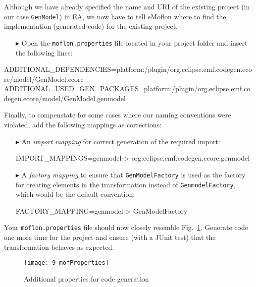 Although we have already specified the name and URI of the existing project (in our case \texttt{GenModel}) in EA, we now have to tell eMoflon where to find the
implementation (generated code) for the existing project.

\begin{enumerate}
\item[$\blacktriangleright$] Open the \texttt{moflon.properties} file located in your project folder and insert the following lines:\\
\end{enumerate}

\vspace{-1cm}
{\small \ttfamily \hspace{-2.5cm} ADDITIONAL\_DEPENDENCIES=platform:/plugin/org.eclipse.emf.codegen.ecore/model/GenModel.ecore} \\
\vspace{0.75cm}%
{\small \ttfamily \hspace{-2.5cm} ADDITIONAL\_USED\_GEN\_PACKAGES=platform:/plugin/org.eclipse.emf.codegen.ecore/model/GenModel.genmodel}

Finally, to compenstate for some cases where our naming conventions were violated, add the following mappings as corrections:

\begin{enumerate}
\item[$\blacktriangleright$] An \emph{import mapping} for correct generation of the required import:

{\small \ttfamily IMPORT\_MAPPINGS=genmodel-> org.eclipse.emf.codegen.ecore.genmodel}


\item [$\blacktriangleright$] A \emph{factory mapping} to ensure that \texttt{GenModelFactory} is used as the factory for creating elements in the
transformation instead of \texttt{Genmodel\-Factory}, which would be the default convention:

{\small \ttfamily FACTORY\_MAPPING=genmodel-> GenModelFactory}

\end{enumerate}


\newpage

Your \texttt{moflon.properties} file should now closely resemble Fig.~\ref{fig_mofProp}. Generate code one more time for the project and ensure (with a JUnit
test) that the transformation behaves as expected.

\vspace{0.5cm}

\begin{figure}[htbp]
\hspace*{-2cm}
\texttt{[image: 9\_mofProperties]}
  \caption{Additional properties for code generation}  
  \label{fig_mofProp}
\end{figure} 
